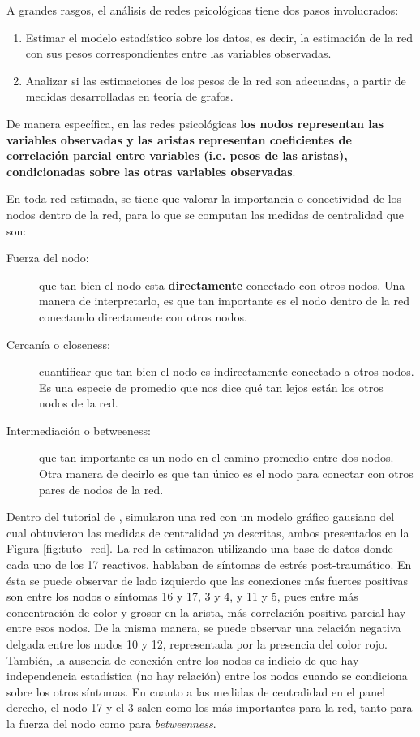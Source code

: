 \documentclass[11pt,spanish]{article}\usepackage[]{graphicx}\usepackage[]{color}
\begin{document}
A grandes rasgos, el análisis de redes psicológicas tiene dos pasos involucrados:

\begin{enumerate}
  \item Estimar el modelo estadístico sobre los datos, es decir, la estimación de la red con sus pesos correspondientes entre las variables observadas. 
  \item Analizar si las estimaciones de los pesos de la red son adecuadas, a partir de medidas desarrolladas en teoría de grafos. 
\end{enumerate}

De manera específica, en las redes psicológicas {\bf los nodos representan las variables observadas y las aristas representan coeficientes de correlación parcial entre variables (i.e. pesos de las aristas), condicionadas sobre las otras variables observadas}. 

En toda red estimada, se tiene que valorar la importancia o conectividad de los nodos dentro de la red, para lo que se computan las medidas de centralidad que son: 

\begin{description}
  \item[Fuerza del nodo:] que tan bien el nodo esta {\bf directamente} conectado con otros nodos. Una manera de interpretarlo, es que tan importante es el nodo dentro de la red conectando directamente con otros nodos. 
  \item[Cercanía o closeness:] cuantificar que tan bien el nodo es indirectamente conectado a otros nodos. Es una especie de promedio que nos dice qué tan lejos están los otros nodos de la red. 
  \item[Intermediación o betweeness:] que tan importante es un nodo en el camino promedio entre dos nodos. Otra manera de decirlo es que tan único es el nodo para conectar con otros pares de nodos de la red. 
\end{description}

Dentro del tutorial de \cite{main_tutorial}, simularon una red con un modelo gráfico gausiano del cual obtuvieron las medidas de centralidad ya descritas, ambos presentados en la Figura \ref{fig:tuto_red}. La red la estimaron utilizando una base de datos donde cada uno de los 17 reactivos, hablaban de síntomas de estrés post-traumático. En ésta se puede observar de lado izquierdo que las conexiones más fuertes positivas son entre los nodos o síntomas 16 y 17, 3 y 4, y 11 y 5, pues entre más concentración de color y grosor en la arista, más correlación positiva parcial hay entre esos nodos. De la misma manera, se puede observar una relación negativa delgada entre los nodos 10 y 12, representada por la presencia del color rojo. También, la ausencia de conexión entre los nodos es indicio de que hay independencia estadística (no hay relación) entre los nodos cuando se condiciona sobre los otros síntomas. En cuanto a las medidas de centralidad en el panel derecho, el nodo 17 y el 3 salen como los más importantes para la red, tanto para la fuerza del nodo como para \emph{betweenness}. 
\end{document}

